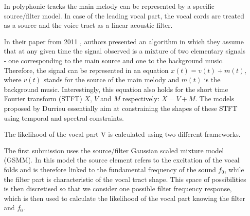 In polyphonic tracks the main melody can be represented by a specific source/filter model. In case of the leading vocal part, the vocal cords are treated as a source and the voice tract as a linear acoustic filter.

In their paper from 2011 \cite{durrieu}, authors presented an algorithm in which they assume that at any given time the signal observed is a mixture of two elementary signals - one corresponding to the main source and one to the background music. Therefore, the signal can be represented in an equation $x(t) = v(t) + m(t)$, where $v(t)$ stands for the source of the main melody and $m(t)$ is the background music. Interestingly, this equation also holds for the short time Fourier transform (STFT)  $X$, $V$ and $M$ respectively: $X = V + M$. The models proposed by Durrieu essentially aim at constraining the shapes of these STFT using temporal and spectral constraints. 


The likelihood of the vocal part V is calculated using two different frameworks. 

The first submission uses the source/filter Gaussian scaled mixture model (GSMM). In this model the source element refers to the excitation of the vocal folds and is therefore linked to the fundamental frequency of the sound $f_{\text{0}}$, while the filter part is characteristic of the vocal tract shape. This space of possibilities is then discretised so that we consider one possible filter frequency response, which is then used to calculate the likelihood of the vocal part knowing the filter and $f_{\text{0}}$.


